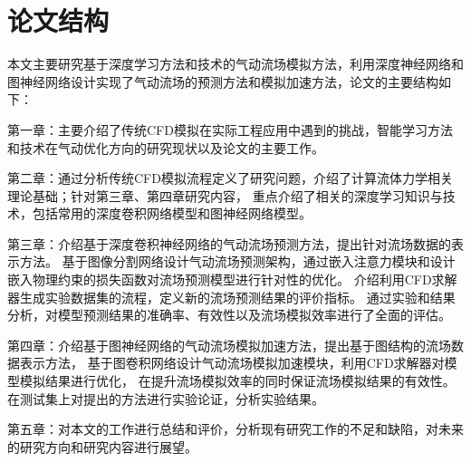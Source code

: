 \section{论文结构}
本文主要研究基于深度学习方法和技术的气动流场模拟方法，利用深度神经网络和图神经网络设计实现了气动流场的预测方法和模拟加速方法，论文的主要结构如下：

第一章：主要介绍了传统CFD模拟在实际工程应用中遇到的挑战，智能学习方法和技术在气动优化方向的研究现状以及论文的主要工作。

第二章：通过分析传统CFD模拟流程定义了研究问题，介绍了计算流体力学相关理论基础；针对第三章、第四章研究内容，
重点介绍了相关的深度学习知识与技术，包括常用的深度卷积网络模型和图神经网络模型。

第三章：介绍基于深度卷积神经网络的气动流场预测方法，提出针对流场数据的表示方法。
基于图像分割网络设计气动流场预测架构，通过嵌入注意力模块和设计嵌入物理约束的损失函数对流场预测模型进行针对性的优化。
介绍利用CFD求解器生成实验数据集的流程，定义新的流场预测结果的评价指标。
通过实验和结果分析，对模型预测结果的准确率、有效性以及流场模拟效率进行了全面的评估。

第四章：介绍基于图神经网络的气动流场模拟加速方法，提出基于图结构的流场数据表示方法，
基于图卷积网络设计气动流场模拟加速模块，利用CFD求解器对模型模拟结果进行优化，
在提升流场模拟效率的同时保证流场模拟结果的有效性。
在测试集上对提出的方法进行实验论证，分析实验结果。

第五章：对本文的工作进行总结和评价，分析现有研究工作的不足和缺陷，对未来的研究方向和研究内容进行展望。












